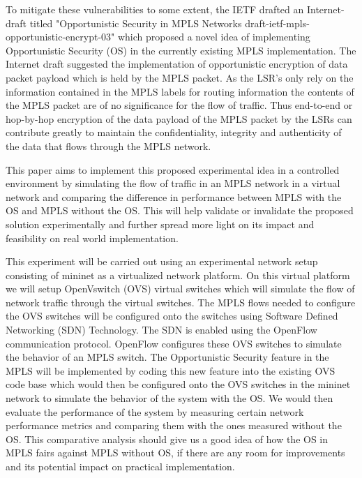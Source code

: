 \documentclass[a4paper, 12pt, oneside]{report}         %
\begin{document}
\begin{thesissummary}
    To mitigate these vulnerabilities to some extent, the IETF drafted an Internet-draft titled "Opportunistic Security in MPLS Networks draft-ietf-mpls-opportunistic-encrypt-03" which proposed a novel idea of implementing Opportunistic Security (OS) in the currently existing MPLS implementation. The Internet draft suggested the implementation of opportunistic encryption of data packet payload which is held by the MPLS packet. As the LSR's only rely on the information contained in the MPLS labels for routing information the contents of the MPLS packet are of no significance for the flow of traffic. Thus end-to-end or hop-by-hop encryption of the data payload of the MPLS packet by the LSRs can contribute greatly to maintain the confidentiality, integrity and authenticity of the data that flows through the MPLS network.
    
    This paper aims to implement this proposed experimental idea in a controlled environment by simulating the flow of traffic in an MPLS network in a virtual network and comparing the difference in performance between MPLS with the OS and MPLS without the OS. This will help validate or invalidate the proposed solution experimentally and further spread more light on its impact and feasibility on real world implementation.
    
    This experiment will be carried out using an experimental network setup consisting of mininet as a virtualized network platform. On this virtual platform we will setup OpenVswitch (OVS) virtual switches which will simulate the flow of network traffic through the virtual switches. The MPLS flows needed to configure the OVS switches will be configured onto the switches using Software Defined Networking (SDN) Technology. The SDN is enabled using the OpenFlow communication protocol. OpenFlow configures these OVS switches to simulate the behavior of an MPLS switch. The Opportunistic Security feature in the MPLS will be implemented by coding this new feature into the existing OVS code base which would then be configured onto the OVS switches in the mininet network to simulate the behavior of the system with the OS. We would then evaluate the performance of the system by measuring certain network performance metrics and comparing them with the ones measured without the OS. This comparative analysis should give us a good idea of how the OS in MPLS fairs against MPLS without OS, if there are any room for improvements and its potential impact on practical implementation. 
 \end{thesissummary}
\end{document}
